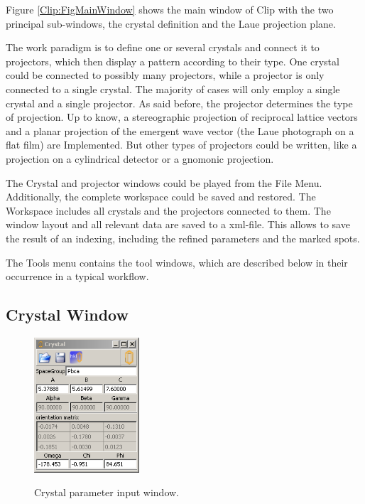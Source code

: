 Figure \ref{Clip:FigMainWindow} shows the main window of Clip with the two
principal sub-windows, the crystal definition and the Laue
projection plane.

The work paradigm is to define one or several crystals and connect it
to projectors, which then display a pattern according to their type.
One crystal could be connected to possibly many projectors, while a
projector is only connected to a single crystal. The majority of cases
will only employ a single crystal and a single projector. As said
before, the projector determines the type of projection. Up to know, a
stereographic projection of reciprocal lattice vectors and a planar
projection of the emergent wave vector (the Laue photograph on a flat
film) are Implemented. But other types of projectors could be written,
like a projection on a cylindrical detector or a gnomonic projection.

The Crystal and projector windows could be played from the File Menu.
Additionally, the complete workspace could be saved and restored. The
Workspace includes all crystals and the projectors connected to
them. The window layout and all relevant data are saved to a
xml-file. This allows to save the result of an indexing, including
the refined parameters and the marked spots.

The Tools menu contains the tool windows, which are described below in
their occurrence in a typical workflow.


\subsection{Crystal Window}


\begin{figure}[htb]
\centering
\includegraphics[width=0.35\textwidth]{clip/Tool_Crystal}
\label{Clip:FigToolCrystal}
\caption{Crystal parameter input window.}
\end{figure}

